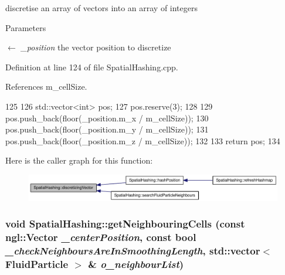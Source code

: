 discretise an array of vectors into an array of integers 


\begin{DoxyParams}{Parameters}
\item[\mbox{$\leftarrow$} {\em \_\-position}]the vector position to discretize \end{DoxyParams}


Definition at line 124 of file SpatialHashing.cpp.



References m\_\-cellSize.




\begin{DoxyCode}
125 {
126     std::vector<int> pos;
127     pos.reserve(3);
128 
129     pos.push_back(floor(_position.m_x / m_cellSize));
130     pos.push_back(floor(_position.m_y / m_cellSize));
131     pos.push_back(floor(_position.m_z / m_cellSize));
132 
133     return pos;
134 }
\end{DoxyCode}




Here is the caller graph for this function:\nopagebreak
\begin{figure}[H]
\begin{center}
\leavevmode
\includegraphics[width=330pt]{class_spatial_hashing_addbd2cd5fde1521533a54ade79787dde_icgraph}
\end{center}
\end{figure}


\hypertarget{class_spatial_hashing_ad75a31f38142a1c2a03eda6afed94db3}{
\subsubsection[{getNeighbouringCells}]{\setlength{\rightskip}{0pt plus 5cm}void SpatialHashing::getNeighbouringCells (const ngl::Vector {\em \_\-centerPosition}, \/  const bool {\em \_\-checkNeighboursAreInSmoothingLength}, \/  std::vector$<$ {\bf FluidParticle} $>$ \& {\em o\_\-neighbourList})}}
\label{class_spatial_hashing_ad75a31f38142a1c2a03eda6afed94db3}


